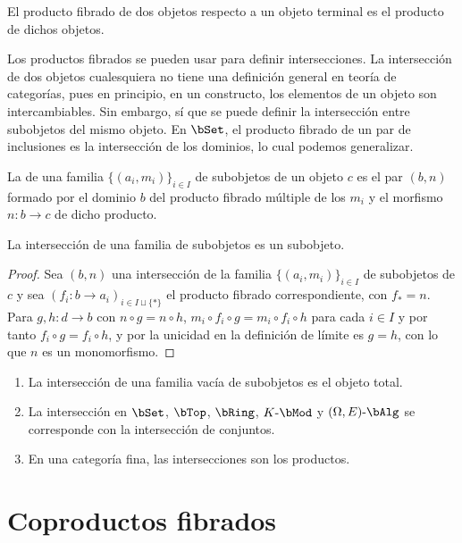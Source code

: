 \begin{proposition}
  El producto fibrado de dos objetos respecto a un objeto terminal es el
  producto de dichos objetos.
\end{proposition}

Los productos fibrados se pueden usar para definir intersecciones. La
intersección de dos objetos cualesquiera no tiene una definición general en
teoría de categorías, pues en principio, en un constructo, los elementos de un
objeto son intercambiables. Sin embargo, sí que se puede definir la intersección
entre subobjetos del mismo objeto. En $\bSet$, el producto fibrado de un par de
inclusiones es la intersección de los dominios, lo cual podemos generalizar.

\begin{definition}
  La  de una familia $\{(a_i,m_i)\}_{i\in I}$ de subobjetos
  de un objeto $c$ es el par $(b,n)$ formado por el dominio $b$ del producto
  fibrado múltiple de los $m_i$ y el morfismo $n:b\to c$ de dicho producto.
\end{definition}

\begin{proposition}
  La intersección de una familia de subobjetos es un subobjeto.
\end{proposition}
\begin{proof}
  Sea $(b,n)$ una intersección de la familia $\{(a_i,m_i)\}_{i\in I}$ de
  subobjetos de $c$ y sea $(f_i:b\to a_i)_{i\in I\sqcup\{*\}}$ el producto
  fibrado correspondiente, con $f_*=n$. Para $g,h:d\to b$ con
  $n\circ g=n\circ h$, $m_i\circ f_i\circ g=m_i\circ f_i\circ h$ para cada
  $i\in I$ y por tanto $f_i\circ g=f_i\circ h$, y por la unicidad en la
  definición de límite es $g=h$, con lo que $n$ es un monomorfismo.
\end{proof}

\begin{example}\;
  \begin{enumerate}
  \item La intersección de una familia vacía de subobjetos es el objeto
    total.
  \item La intersección en $\bSet$, $\bTop$, $\bRing$, $K\dash\bMod$ y
    $(\Omega,E)\dash\bAlg$ se corresponde con la intersección de conjuntos.
  \item En una categoría fina, las intersecciones son los productos.
  \end{enumerate}
\end{example}

\section{Coproductos fibrados}

